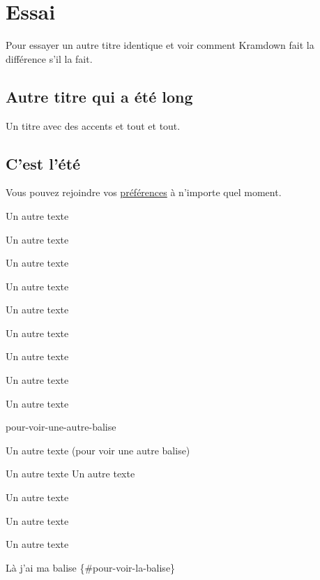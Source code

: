 % 
% 
% 
% 
% 
% 
% 
% 

\section{Essai}\hypertarget{specific-id-pour-essai}{}\label{specific-id-pour-essai}

Pour essayer un autre titre identique et voir comment Kramdown fait la différence s'il la fait.

\subsection{Autre titre qui a été long}\hypertarget{autre-titre-qui-a-t-long}{}\label{autre-titre-qui-a-t-long}

Un titre avec des accents et tout et tout.

\subsection{C'est l'été}\hypertarget{cest-lt}{}\label{cest-lt}

Vous pouvez rejoindre vos \hyperlink{preferences-auteur}{préférences} à n'importe quel moment.

Un autre texte

Un autre texte

Un autre texte

Un autre texte

Un autre texte

Un autre texte

Un autre texte

Un autre texte

Un autre texte

pour-voir-une-autre-balise

Un autre texte (pour voir une autre balise)

Un autre texte
Un autre texte

Un autre texte

Un autre texte

Un autre texte

Là j'ai ma balise \{\#pour-voir-la-balise\}

